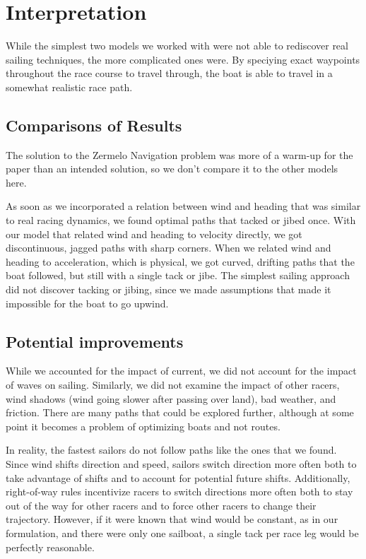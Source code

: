 \documentclass[11pt]{amsart}
\begin{document}
\section{Interpretation}

\par While the simplest two models we worked with were not able to rediscover real sailing techniques, the more complicated ones were. By speciying exact waypoints throughout the race course to travel through, the boat is able to travel in a somewhat realistic race path.

\subsection{Comparisons of Results}

\par The solution to the Zermelo Navigation problem was more of a warm-up for the paper than an intended solution, so we don't compare it to the other models here.

\par As soon as we incorporated a relation between wind and heading that was similar to real racing dynamics, we found optimal paths that tacked or jibed once. With our model that related wind and heading to velocity directly, we got discontinuous, jagged paths with sharp corners. When we related wind and heading to acceleration, which is physical, we got curved, drifting paths that the boat followed, but still with a single tack or jibe. The simplest sailing approach did not discover tacking or jibing, since we made assumptions that made it impossible for the boat to go upwind.

\subsection{Potential improvements}

\par While we accounted for the impact of current, we did not account for the impact of waves on sailing. Similarly, we did not examine the impact of other racers, wind shadows (wind going slower after passing over land), bad weather, and friction. There are many paths that could be explored further, although at some point it becomes a problem of optimizing boats and not routes.

\par In reality, the fastest sailors do not follow paths like the ones that we found. Since wind shifts direction and speed, sailors switch direction more often both to take advantage of shifts and to account for potential future shifts. Additionally, right-of-way rules incentivize racers to switch directions more often both to stay out of the way for other racers and to force other racers to change their trajectory. However, if it were known that wind would be constant, as in our formulation, and there were only one sailboat, a single tack per race leg would be perfectly reasonable.
\end{document}
